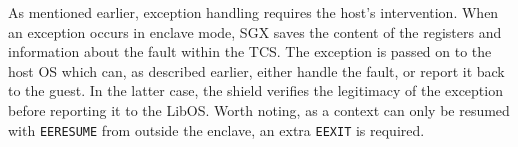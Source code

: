 As mentioned earlier, exception handling requires the host's intervention.
When an exception occurs in enclave mode, SGX saves the content of the registers and information about the fault within the TCS.
The exception is passed on to the host OS which can, as described earlier, either handle the fault, or report it back to the guest.
In the latter case, the shield verifies the legitimacy of the exception before reporting it to the LibOS.
Worth noting, as a context can only be resumed with \lstinline{EERESUME} from outside the enclave, an extra \lstinline{EEXIT} is required.
%
% 
% 
% 
% 
% 
% 
% 
% 
